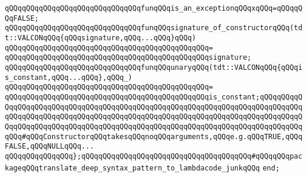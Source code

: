 \verb|qQQqqQQqqQQqqQQqqQQqqQQqqQQqqQQqfunqQQqis_an_exceptionqQQqxqQQq=qQQqqQQqFALSE;|\newline
\newline
\verb|qQQqqQQqqQQqqQQqqQQqqQQqqQQqqQQqfunqQQqsignature_of_constructorqQQq(tdt::VALCONqQQq{qQQqsignature,qQQq...qQQq}qQQq)|\newline
\verb|qQQqqQQqqQQqqQQqqQQqqQQqqQQqqQQqqQQqqQQqqQQqqQQq=|\newline
\verb|qQQqqQQqqQQqqQQqqQQqqQQqqQQqqQQqqQQqqQQqqQQqqQQqsignature;|\newline
\newline
\verb|qQQqqQQqqQQqqQQqqQQqqQQqqQQqqQQqfunqQQqunaryqQQq(tdt::VALCONqQQq{qQQqis_constant,qQQq...qQQq},qQQq_)|\newline
\verb|qQQqqQQqqQQqqQQqqQQqqQQqqQQqqQQqqQQqqQQqqQQqqQQq=|\newline
\verb|qQQqqQQqqQQqqQQqqQQqqQQqqQQqqQQqqQQqqQQqqQQqqQQqis_constant;qQQqqQQqqQQqqQQqqQQqqQQqqQQqqQQqqQQqqQQqqQQqqQQqqQQqqQQqqQQqqQQqqQQqqQQqqQQqqQQqqQQqqQQqqQQqqQQqqQQqqQQqqQQqqQQqqQQqqQQqqQQqqQQqqQQqqQQqqQQqqQQqqQQqqQQqqQQqqQQqqQQqqQQqqQQqqQQqqQQqqQQqqQQqqQQqqQQqqQQqqQQqqQQqqQQqqQQqqQQqqQQq#qQQqConstructorqQQqtakesqQQqnoqQQqarguments,qQQqe.g.qQQqTRUE,qQQqFALSE,qQQqNULLqQQq...|\newline
\newline
\verb|qQQqqQQqqQQqqQQq};qQQqqQQqqQQqqQQqqQQqqQQqqQQqqQQqqQQqqQQq#qQQqqQQqpackageqQQqtranslate_deep_syntax_pattern_to_lambdacode_junkqQQq|\newline
\verb|end;|\newline
\newline
\newline
\newline


